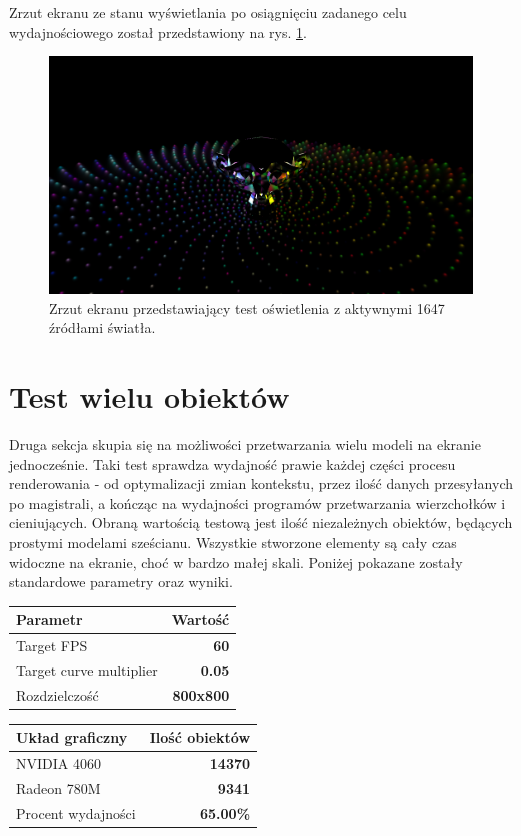 Zrzut ekranu ze stanu wyświetlania po osiągnięciu zadanego celu wydajnościowego został przedstawiony na rys. \ref{demo_test_lights}.

\begin{figure}[h!]
	\centering
	\includegraphics[width=\textwidth]{images/demo_test_lights.png}
	\caption{Zrzut ekranu przedstawiający test oświetlenia z aktywnymi 1647 źródłami światła.}
	\label{demo_test_lights}
\end{figure}

\vfill
\clearpage

\section{Test wielu obiektów}
\label{section_test_multilpe_objects}
Druga sekcja skupia się na możliwości przetwarzania wielu modeli na ekranie jednocześnie. Taki test sprawdza wydajność prawie każdej części procesu renderowania - od optymalizacji zmian kontekstu, przez ilość danych przesyłanych po magistrali, a kończąc na wydajności programów przetwarzania wierzchołków i cieniujących. Obraną wartością testową jest ilość niezależnych obiektów, będących prostymi modelami sześcianu. Wszystkie stworzone elementy są cały czas widoczne na ekranie, choć w bardzo małej skali. Poniżej pokazane zostały standardowe parametry oraz wyniki.

\begin{center}
	\begin{tabular}{ |l r|}
		\hline
		\textbf{Parametr} & \textbf{Wartość} \\
		\hline
		Target FPS & \textbf{60} \\
		Target curve multiplier & \textbf{0.05} \\
		Rozdzielczość & \textbf{800x800} \\
		\hline
	\end{tabular}
	\quad
	\begin{tabular}{ |l r|}
		\hline
		\textbf{Układ graficzny} & \textbf{Ilość obiektów} \\
		\hline
		NVIDIA 4060 & \textbf{14370} \\
		Radeon 780M & \textbf{9341} \\
		\hline
		Procent wydajności & \textbf{65.00\%} \\
		\hline
	\end{tabular}
\end{center}

